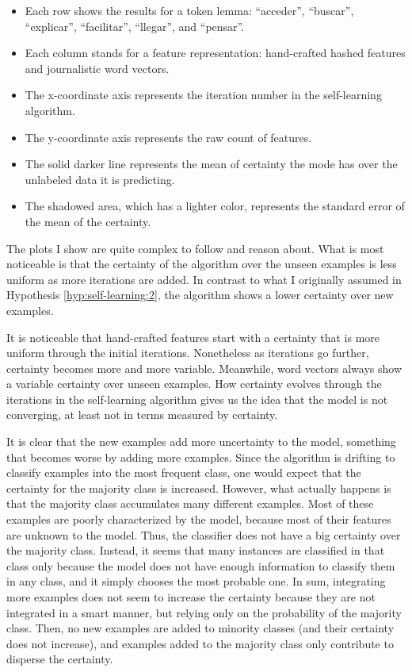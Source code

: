 \begin{itemize}
  \item Each row shows the results for a token lemma: ``acceder'', ``buscar'',
    ``explicar'', ``facilitar'', ``llegar'', and ``pensar''.
  \item Each column stands for a feature representation: hand-crafted hashed
    features and journalistic word vectors.
  \item The x-coordinate axis represents the iteration number in the
    self-learning algorithm.
  \item The y-coordinate axis represents the raw count of features.
  \item The solid darker line represents the mean of certainty the mode has
    over the unlabeled data it is predicting.
  \item The shadowed area, which has a lighter color, represents the standard
    error of the mean of the certainty.
\end{itemize}

The plots I show are quite complex to follow and reason about. What is most
noticeable is that the certainty of the algorithm over the unseen examples is
less uniform as more iterations are added. In contrast to what I originally
assumed in Hypothesis \ref{hyp:self-learning:2}, the algorithm shows a lower
certainty over new examples. 

It is noticeable that hand-crafted features start with a certainty that is more
uniform through the initial iterations. Nonetheless as iterations go further,
certainty becomes more and more variable. Meanwhile, word vectors always show a
variable certainty over unseen examples. How certainty evolves through the
iterations in the self-learning algorithm gives us the idea that the model is
not converging, at least not in terms measured by certainty.

It is clear that the new examples add more uncertainty to the model, something
that becomes worse by adding more examples. Since the algorithm is drifting to
classify examples into the most frequent class, one would expect that the
certainty for the majority class is increased. However, what actually happens
is that the majority class accumulates many different examples. Most of these
examples are poorly characterized by the model, because most of their features
are unknown to the model. Thus, the classifier does not have a big certainty
over the majority class. Instead, it seems that many instances are classified
in that class only because the model does not have enough information to
classify them in any class, and it simply chooses the most probable one. In
sum, integrating more examples does not seem to increase the certainty because
they are not integrated in a smart manner, but relying only on the probability
of the majority class. Then, no new examples are added to minority classes (and
their certainty does not increase), and examples added to the majority class
only contribute to disperse the certainty.

